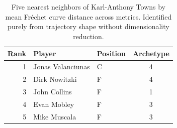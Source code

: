 \begin{table}[htbp]
  \centering\small
  \begin{tabular}{rllc}
    \toprule
    Rank & Player & Position & Archetype \\
    \midrule
    1 & Jonas Valanciunas & C & 4 \\
    2 & Dirk Nowitzki & F & 4 \\
    3 & John Collins & F & 1 \\
    4 & Evan Mobley & F & 3 \\
    5 & Mike Muscala & F & 3 \\
    \bottomrule
  \end{tabular}
  \caption{Five nearest neighbors of Karl-Anthony Towns by mean Fr\'{e}chet curve distance across metrics. Identified purely from trajectory shape without dimensionality reduction.}
  \label{tab:Karl_Anthony_Towns_frechet_curve_neighbors}
\end{table}

